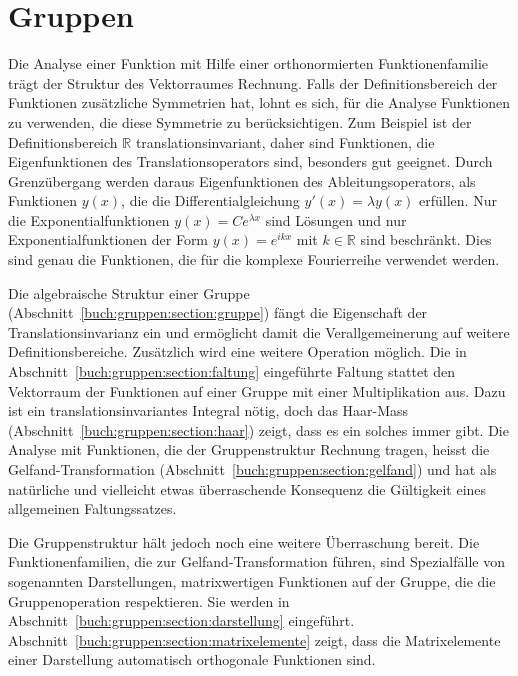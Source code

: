 %
%
%
\chapter{Gruppen
\label{buch:chapter:gruppen}}
Die Analyse einer Funktion mit Hilfe einer orthonormierten
Funktionenfamilie trägt der Struktur des Vektorraumes Rechnung.
Falls der Definitionsbereich der Funktionen zusätzliche Symmetrien
hat, lohnt es sich, für die Analyse Funktionen zu verwenden, die
diese Symmetrie zu berücksichtigen.
Zum Beispiel ist der Definitionsbereich $\mathbb{R}$ translationsinvariant,
daher sind Funktionen, die Eigenfunktionen des Translationsoperators
sind, besonders gut geeignet. 
Durch Grenzübergang werden daraus Eigenfunktionen des Ableitungsoperators,
als Funktionen $y(x)$, die die Differentialgleichung $y'(x)=\lambda y(x)$
erfüllen.
Nur die Exponentialfunktionen $y(x)=Ce^{\lambda x}$ sind Lösungen und nur
Exponentialfunktionen der Form $y(x)=e^{ikx}$ mit $k\in\mathbb{R}$
sind beschränkt.
Dies sind genau die Funktionen, die für die komplexe Fourierreihe
verwendet werden.

Die algebraische Struktur einer Gruppe
(Abschnitt~\ref{buch:gruppen:section:gruppe})
fängt die Eigenschaft der Translationsinvarianz ein und ermöglicht
damit die Verallgemeinerung auf weitere Definitionsbereiche.
Zusätzlich wird eine weitere Operation möglich.
Die in Abschnitt~\ref{buch:gruppen:section:faltung} eingeführte
Faltung stattet den Vektorraum der Funktionen auf einer Gruppe
mit einer Multiplikation aus.
Dazu ist ein translationsinvariantes Integral nötig, doch das
Haar-Mass (Abschnitt~\ref{buch:gruppen:section:haar}) zeigt,
dass es ein solches immer gibt.
Die Analyse mit Funktionen, die der Gruppenstruktur Rechnung tragen,
heisst die Gelfand-Transformation
(Abschnitt~\ref{buch:gruppen:section:gelfand})
und hat als natürliche und vielleicht
etwas überraschende Konsequenz die Gültigkeit eines allgemeinen
Faltungssatzes.

Die Gruppenstruktur hält jedoch noch eine weitere Überraschung bereit.
Die Funktionenfamilien, die zur Gelfand-Transformation führen,
sind Spezialfälle von sogenannten Darstellungen, matrixwertigen
Funktionen auf der Gruppe, die die Gruppenoperation respektieren.
Sie werden in Abschnitt~\ref{buch:gruppen:section:darstellung}
eingeführt.
Abschnitt~\ref{buch:gruppen:section:matrixelemente} zeigt, dass
die Matrixelemente einer Darstellung automatisch orthogonale Funktionen
sind.

